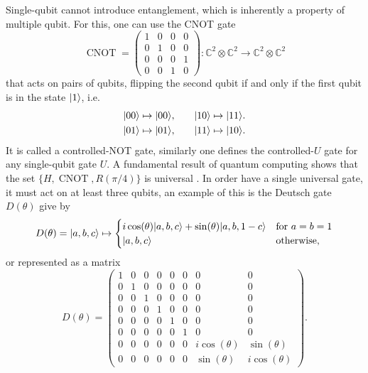 Single-qubit cannot introduce entanglement, which is inherently a property of multiple qubit. For this, one can use the CNOT gate
\begin{equation}
  \operatorname{CNOT} =
  \begin{pmatrix}
    1 & 0 & 0 & 0 \\
    0 & 1 & 0 & 0 \\
    0 & 0 & 0 & 1 \\
    0 & 0 & 1 & 0
  \end{pmatrix} : \mathbb{C}^2 ⊗ \mathbb{C}^2 \to \mathbb{C}^2 ⊗ \mathbb{C}^2
\end{equation}
that acts on pairs of qubits, flipping the second qubit if and only if the first qubit is in the state $\lvert1\rangle$, i.e.
\begin{equation}
  \begin{aligned}
    \lvert00\rangle \mapsto \lvert00\rangle,\quad &\quad \lvert10\rangle \mapsto \lvert11\rangle. \\
    \lvert01\rangle \mapsto \lvert01\rangle,\quad &\quad \lvert11\rangle \mapsto \lvert10\rangle.
  \end{aligned}
\end{equation}
It is called a controlled-NOT gate, similarly one defines the controlled-$U$ gate for any single-qubit gate $U$. A fundamental result of quantum computing shows that the set $\{H, \operatorname{CNOT}, R(\pi/4)\}$ is universal \cite{nielsen chuang}. In order have a single universal gate, it must act on at least three qubits, an example of this is the Deutsch gate $D(\theta)$ give by
\begin{equation}
  D(\theta) = \lvert a,b,c\rangle \mapsto
  \begin{cases}
    i \cos(\theta) \lvert a,b,c\rangle + \sin(\theta) \lvert a,b,1-c\rangle & \mbox{for }a=b=1 \\
    \lvert a,b,c\rangle & \mbox{otherwise,}
  \end{cases}
\end{equation}
or represented as a matrix
\begin{equation}
  D(\theta) =
  \begin{pmatrix}
    1 & 0 & 0 & 0 & 0 & 0 & 0 & 0 \\
    0 & 1 & 0 & 0 & 0 & 0 & 0 & 0 \\
    0 & 0 & 1 & 0 & 0 & 0 & 0 & 0 \\
    0 & 0 & 0 & 1 & 0 & 0 & 0 & 0 \\
    0 & 0 & 0 & 0 & 1 & 0 & 0 & 0 \\
    0 & 0 & 0 & 0 & 0 & 1 & 0 & 0 \\
    0 & 0 & 0 & 0 & 0 & 0 & i\cos(\theta) & \sin(\theta) \\
    0 & 0 & 0 & 0 & 0 & 0 & \sin(\theta) & i\cos(\theta)
  \end{pmatrix}.
\end{equation}
